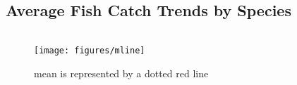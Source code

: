 \documentclass[
]{book}
\begin{document}
\hypertarget{average-fish-catch-trends-by-species}{%
\subsection{Average Fish Catch Trends by Species}\label{average-fish-catch-trends-by-species}}

\begin{columns-nocenter}

\begin{column}

\begin{figure}
\texttt{[image: figures/mline]} \caption{mean is represented by a dotted red line}\label{fig:unnamed-chunk-169}
\end{figure}

\end{column}

\begin{column}

\end{column}

\begin{column}

\end{column}

\end{columns-nocenter}
\end{document}
